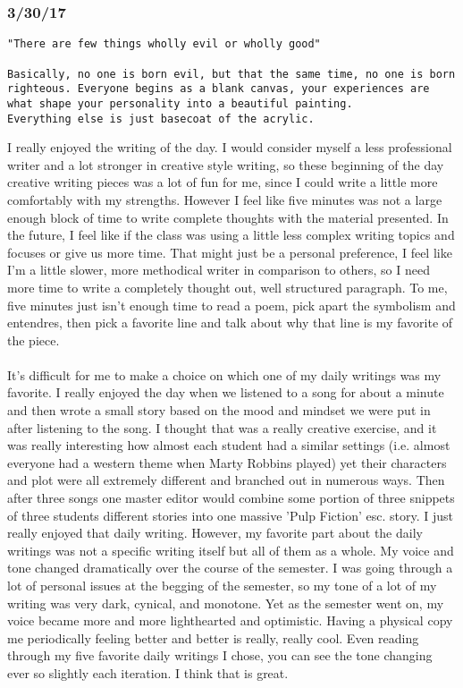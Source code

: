 \documentclass[10pt,letterpaper]{article}
\begin{document}
\subsubsection*{3/30/17}
\begin{verbatim}
"There are few things wholly evil or wholly good"

Basically, no one is born evil, but that the same time, no one is born
righteous. Everyone begins as a blank canvas, your experiences are 
what shape your personality into a beautiful painting.
Everything else is just basecoat of the acrylic. 
\end{verbatim}
I really enjoyed the writing of the day. I would consider myself a less professional writer and a lot stronger in creative style writing, so these beginning of the day creative writing pieces was a lot of fun for me, since I could write a little more comfortably with my strengths. However I feel like five minutes was not a large enough block of time to write complete thoughts with the material presented. In the future, I feel like if the class was using a little less complex writing topics and focuses or give us more time. That might just be a personal preference, I feel like I'm a little slower, more methodical writer in comparison to others, so I need more time to write a completely thought out, well structured paragraph. To me, five minutes just isn't enough time to read a poem, pick apart the symbolism and entendres, then pick a favorite line and talk about why that line is my favorite of the piece.\\
\\
It's difficult for me to make a choice on which one of my daily writings was my favorite. I really enjoyed the day when we listened to a song for about a minute and then wrote a small story based on the mood and mindset we were put in after listening to the song. I thought that was a really creative exercise, and it was really interesting how almost each student had a similar settings (i.e. almost everyone had a western theme when Marty Robbins played) yet their characters and plot were all extremely different and branched out in numerous ways. Then after three songs one master editor would combine some portion of three snippets of three students different stories into one massive 'Pulp Fiction' esc. story. I just really enjoyed that daily writing. However, my favorite part about the daily writings was not a specific writing itself but all of them as a whole. My voice and tone changed dramatically over the course of the semester. I was going through a lot of personal issues at the begging of the semester, so my tone of a lot of my writing was very dark, cynical, and monotone. Yet as the semester went on, my voice became more and more lighthearted and optimistic. Having a physical copy me periodically feeling better and better is really, really cool. Even reading through my five favorite daily writings I chose, you can see the tone changing ever so slightly each iteration. I think that is great. 
\end{document}
